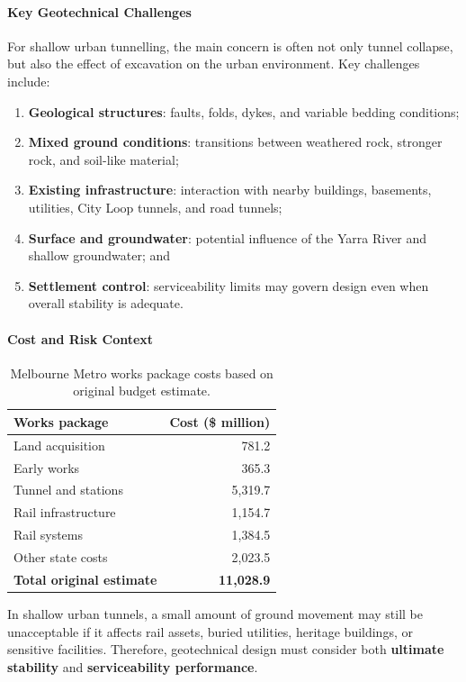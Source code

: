 \paragraph{Key Geotechnical Challenges}
For shallow urban tunnelling, the main concern is often not only tunnel collapse, but also the effect of excavation on the urban environment. Key challenges include:
\begin{enumerate}
 \item \textbf{Geological structures}: faults, folds, dykes, and variable bedding conditions;
 \item \textbf{Mixed ground conditions}: transitions between weathered rock, stronger rock, and soil-like material;
 \item \textbf{Existing infrastructure}: interaction with nearby buildings, basements, utilities, City Loop tunnels, and road tunnels;
 \item \textbf{Surface and groundwater}: potential influence of the Yarra River and shallow groundwater; and
 \item \textbf{Settlement control}: serviceability limits may govern design even when overall stability is adequate.
\end{enumerate}

\paragraph{Cost and Risk Context}

\begin{table}[H]
\centering
\small
\begin{tabularx}{0.8\textwidth}{X r}
\toprule
\textbf{Works package} & \textbf{Cost (\$ million)} \\
\midrule
Land acquisition & 781.2 \\
Early works & 365.3 \\
Tunnel and stations & 5,319.7 \\
Rail infrastructure & 1,154.7 \\
Rail systems & 1,384.5 \\
Other state costs & 2,023.5 \\
\midrule
\textbf{Total original estimate} & \textbf{11,028.9} \\
\bottomrule
\end{tabularx}
\caption{Melbourne Metro works package costs based on original budget estimate.}
\end{table}

\begin{keybox}
In shallow urban tunnels, a small amount of ground movement may still be unacceptable if it affects rail assets, buried utilities, heritage buildings, or sensitive facilities. Therefore, geotechnical design must consider both \textbf{ultimate stability} and \textbf{serviceability performance}.
\end{keybox}

